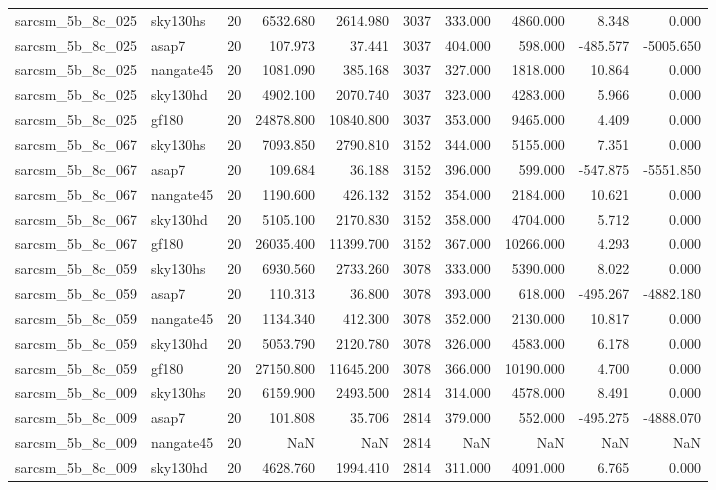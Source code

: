 \begin{longtable}{llrrrrrrrr}
sarcsm\_5b\_8c\_025 & sky130hs & 20 & 6532.680 & 2614.980 & 3037 & 333.000 & 4860.000 & 8.348 & 0.000 \\
sarcsm\_5b\_8c\_025 & asap7 & 20 & 107.973 & 37.441 & 3037 & 404.000 & 598.000 & -485.577 & -5005.650 \\
sarcsm\_5b\_8c\_025 & nangate45 & 20 & 1081.090 & 385.168 & 3037 & 327.000 & 1818.000 & 10.864 & 0.000 \\
sarcsm\_5b\_8c\_025 & sky130hd & 20 & 4902.100 & 2070.740 & 3037 & 323.000 & 4283.000 & 5.966 & 0.000 \\
sarcsm\_5b\_8c\_025 & gf180 & 20 & 24878.800 & 10840.800 & 3037 & 353.000 & 9465.000 & 4.409 & 0.000 \\
sarcsm\_5b\_8c\_067 & sky130hs & 20 & 7093.850 & 2790.810 & 3152 & 344.000 & 5155.000 & 7.351 & 0.000 \\
sarcsm\_5b\_8c\_067 & asap7 & 20 & 109.684 & 36.188 & 3152 & 396.000 & 599.000 & -547.875 & -5551.850 \\
sarcsm\_5b\_8c\_067 & nangate45 & 20 & 1190.600 & 426.132 & 3152 & 354.000 & 2184.000 & 10.621 & 0.000 \\
sarcsm\_5b\_8c\_067 & sky130hd & 20 & 5105.100 & 2170.830 & 3152 & 358.000 & 4704.000 & 5.712 & 0.000 \\
sarcsm\_5b\_8c\_067 & gf180 & 20 & 26035.400 & 11399.700 & 3152 & 367.000 & 10266.000 & 4.293 & 0.000 \\
sarcsm\_5b\_8c\_059 & sky130hs & 20 & 6930.560 & 2733.260 & 3078 & 333.000 & 5390.000 & 8.022 & 0.000 \\
sarcsm\_5b\_8c\_059 & asap7 & 20 & 110.313 & 36.800 & 3078 & 393.000 & 618.000 & -495.267 & -4882.180 \\
sarcsm\_5b\_8c\_059 & nangate45 & 20 & 1134.340 & 412.300 & 3078 & 352.000 & 2130.000 & 10.817 & 0.000 \\
sarcsm\_5b\_8c\_059 & sky130hd & 20 & 5053.790 & 2120.780 & 3078 & 326.000 & 4583.000 & 6.178 & 0.000 \\
sarcsm\_5b\_8c\_059 & gf180 & 20 & 27150.800 & 11645.200 & 3078 & 366.000 & 10190.000 & 4.700 & 0.000 \\
sarcsm\_5b\_8c\_009 & sky130hs & 20 & 6159.900 & 2493.500 & 2814 & 314.000 & 4578.000 & 8.491 & 0.000 \\
sarcsm\_5b\_8c\_009 & asap7 & 20 & 101.808 & 35.706 & 2814 & 379.000 & 552.000 & -495.275 & -4888.070 \\
sarcsm\_5b\_8c\_009 & nangate45 & 20 & NaN & NaN & 2814 & NaN & NaN & NaN & NaN \\
sarcsm\_5b\_8c\_009 & sky130hd & 20 & 4628.760 & 1994.410 & 2814 & 311.000 & 4091.000 & 6.765 & 0.000 \\

\end{longtable}
